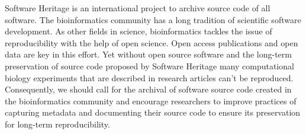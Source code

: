 \documentclass[long, final]{jobim}
\begin{document}
Software Heritage is an international project to archive source code of all software. The bioinformatics community has a long tradition of scientific software development. As other fields in science, bioinformatics tackles the issue of reproducibility with the help of open science. Open access publications and open data are key in this effort. Yet without open source software and the long-term preservation of source code proposed by Software Heritage many computational biology experiments that are described in research articles can’t be reproduced. Consequently, we should call for the archival of software source code created in the bioinformatics community and encourage researchers to improve practices of capturing metadata and documenting their source code to ensure its preservation for long-term reproducibility.


\printbibliography
\end{document}
